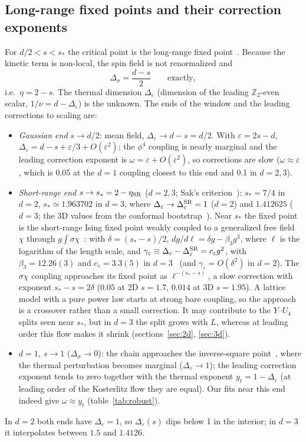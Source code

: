 \documentclass[10pt,a4paper]{article}
\newcommand{\Ds}{\Delta_\sigma}
\newcommand{\De}{\Delta_\varepsilon}
\begin{document}
\subsection{Long-range fixed points and their correction exponents}
For $d/2<s<s_*$ the critical point is the long-range fixed point~\cite{Fisher:1972zz,Sak:1973oqx,Paulos:2015jfa}. Because the kinetic term is
non-local, the spin field is not renormalized and
\begin{equation}
 \Ds=\frac{d-s}{2}\qquad\text{exactly},
\end{equation}
i.e.\ $\eta=2-s$. The thermal dimension $\De$ (dimension of the leading $\mathbb Z_2$-even scalar, $1/\nu=d-\De$) is the unknown. The ends of the
window and the leading corrections to scaling are:
\begin{itemize}
\item \emph{Gaussian end} $s\to d/2$: mean field, $\De\to d-s=d/2$. With $\varepsilon=2s-d$, $\De=d-s+\varepsilon/3+O(\varepsilon^2)$; the
 $\phi^4$ coupling is nearly marginal and the leading correction exponent is $\omega=\varepsilon+O(\varepsilon^2)$, so corrections are slow
 ($\omega\approx\varepsilon$, which is 0.05 at the $d=1$ coupling closest to this end and 0.1 in $d=2,3$).
\item \emph{Short-range end} $s\to s_*=2-\eta_{\rm SR}$ ($d=2,3$; Sak's criterion~\cite{Sak:1973oqx}): $s_*=7/4$ in $d=2$, $s_*\simeq1.963702$
 in $d=3$, where $\De\to\De^{\rm SR}=1$ ($d=2$) and $1.412625$ ($d=3$; the 3D values from the conformal bootstrap~\cite{Chang:2024whx}). Near $s_*$ the fixed point is the short-range Ising fixed point
 weakly coupled to a generalized free field $\chi$ through $g\int\sigma\chi$~\cite{Behan:2017dwr,Behan:2017emf}: with $\delta=(s_*-s)/2$,
 $dg/d\ell=\delta g-\beta_3g^3$, where $\ell$ is the logarithm of the length scale, and $\gamma_\varepsilon\equiv\De-\De^{\rm SR}=c_\varepsilon
 g^2$, with $\beta_3=12.26(3)$ and $c_\varepsilon=3.3(5)$ in $d=3$~\cite[eqs.~(2.24), (3.41)]{Behan:2017emf} (and $\gamma_\varepsilon=O(\delta^2)$ in
 $d=2$). The $\sigma\chi$ coupling approaches its fixed point as $\ell^{-(s_*-s)}$, a slow correction with
 exponent $s_*-s=2\delta$ ($0.05$ at 2D $s=1.7$, $0.014$ at 3D $s=1.95$). A lattice model with a pure power law starts at strong bare
 coupling, so the approach is a crossover rather than a small correction. It may contribute to the $Y$--$U_4$ splits seen near $s_*$, but in
 $d=3$ the split grows with $L$, whereas at leading order this flow makes it shrink (sections~\ref{sec:2d}, \ref{sec:3d}).
\item \emph{$d=1$, $s\to1$} ($\Ds\to0$): the chain approaches the inverse-square point~\cite{Kosterlitz:1976zz,Cardy:1981xx}, where the
 thermal perturbation becomes marginal ($\De\to1$); the leading correction exponent tends to zero together with the thermal exponent
 $y_t=1-\De$ (at leading order of the Kosterlitz flow they are equal). Our fits near this end indeed give $\omega\approx y_t$ (table~\ref{tab:robust}).
\end{itemize}
In $d=2$ both ends have $\De=1$, so $\De(s)$ dips below 1 in the interior; in $d=3$ it interpolates between $1.5$ and $1.4126$.
\end{document}
